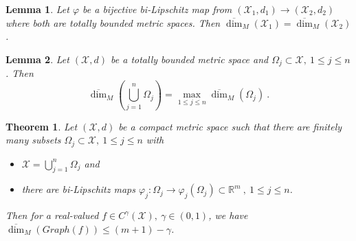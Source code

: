 \documentclass[10pt,a4paper]{amsart}
\newtheorem{theorem}{Theorem}
\newtheorem{lemma}{Lemma}
\begin{document}
\begin{lemma} \label{gmt_lemma1}
Let $\varphi$ be a bijective bi-Lipschitz map from $(\mathcal{X}_1,d_1) \to (\mathcal{X}_2,d_2)$ where both are totally bounded metric spaces. Then $\overline{\dim}_M\left(\mathcal{X}_1\right)=\overline{\dim}_M\left(\mathcal{X}_2\right)$\:.
\end{lemma}

\begin{lemma} \label{gmt_lemma2}
Let  $\left(\mathcal{X},d\right)$ be a totally bounded metric space and $\Omega_j \subset \mathcal{X},\:1\le j \le n$. Then 
\begin{equation*}
\overline{\dim}_M\left(\bigcup_{j=1}^n\Omega_j\right) = \max_{1 \le j \le n}\overline{\dim}_M\left(\Omega_j\right)\:.
\end{equation*} 
\end{lemma}

\begin{theorem} \label{thm_gmt}
Let $(\mathcal{X},d)$ be a compact metric space such that there are finitely many subsets $\Omega_j \subset \mathcal{X},\:1 \le j \le n$ with
\begin{itemize}
\item $\mathcal{X} = \displaystyle\bigcup_{j=1}^n \Omega_j$ and
\item there are bi-Lipschitz maps $\varphi_j : \Omega_j \to \varphi_j\left(\Omega_j\right) \subset \mathbb{R}^m\:,\: 1\le j \le n$. 
\end{itemize}
Then for a real-valued $f \in C^\gamma(\mathcal{X}),\:\gamma \in (0,1)$, we have $\overline{\dim}_M\left(Graph(f)\right) \le (m+1)-\gamma$\:.
\end{theorem}
\end{document}
